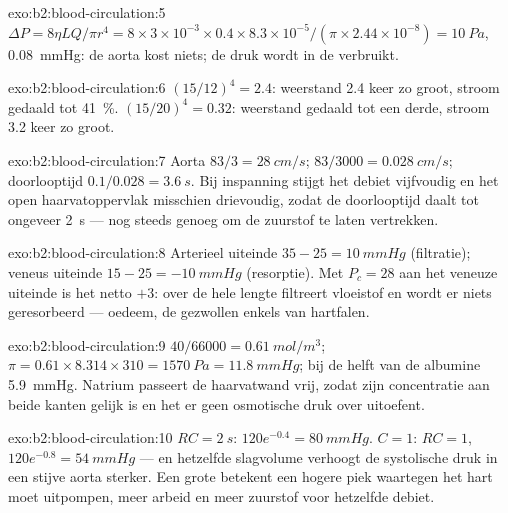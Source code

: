 \begin{solution}{exo:b2:blood-circulation:5}
$\Delta P = 8\eta LQ/\pi r^{4} = 8\times 3\times 10^{-3}\times
0.4\times 8.3\times 10^{-5}/(\pi\times 2.44\times 10^{-8}) =
\qty{10}{Pa}$, \qty{0.08}{mmHg}: de aorta kost niets; de druk wordt in de
 verbruikt.
\end{solution}

\begin{solution}{exo:b2:blood-circulation:6}
$(15/12)^{4} = 2.4$: weerstand 2.4 keer zo groot, stroom gedaald tot
\qty{41}{\%}. $(15/20)^{4} = 0.32$: weerstand gedaald tot een derde, stroom
3.2 keer zo groot.
\end{solution}

\begin{solution}{exo:b2:blood-circulation:7}
Aorta $83/3 = \qty{28}{cm/s}$;  $83/3000 =
\qty{0.028}{cm/s}$; doorlooptijd $0.1/0.028 = \qty{3.6}{s}$. Bij inspanning
stijgt het debiet vijfvoudig en het open haarvatoppervlak misschien
drievoudig, zodat de doorlooptijd daalt tot ongeveer \qty{2}{s} --- nog
steeds genoeg om de zuurstof te laten vertrekken.
\end{solution}

\begin{solution}{exo:b2:blood-circulation:8}
Arterieel uiteinde $35 - 25 = \qty{+10}{mmHg}$ (filtratie); veneus uiteinde $15
- 25 = \qty{-10}{mmHg}$ (resorptie). Met $P_c = 28$ aan het veneuze
uiteinde is het netto $+3$: over de hele lengte filtreert vloeistof en wordt
er niets geresorbeerd --- oedeem, de gezwollen enkels van hartfalen.
\end{solution}

\begin{solution}{exo:b2:blood-circulation:9}
$40/66000 = \qty{0.61}{mol/m^3}$; $\pi = 0.61\times 8.314\times 310 =
\qty{1570}{Pa} = \qty{11.8}{mmHg}$; bij de helft van de albumine
\qty{5.9}{mmHg}. Natrium passeert de haarvatwand vrij, zodat zijn
concentratie aan beide kanten gelijk is en het er geen osmotische druk over
uitoefent.
\end{solution}

\begin{solution}{exo:b2:blood-circulation:10}
$RC = \qty{2}{s}$: $120e^{-0.4} = \qty{80}{mmHg}$. $C = 1$: $RC = 1$,
$120e^{-0.8} = \qty{54}{mmHg}$ --- en hetzelfde slagvolume verhoogt de
systolische druk in een stijve aorta sterker. Een grote  betekent
een hogere piek waartegen het hart moet uitpompen, meer arbeid en meer
zuurstof voor hetzelfde debiet.
\end{solution}

